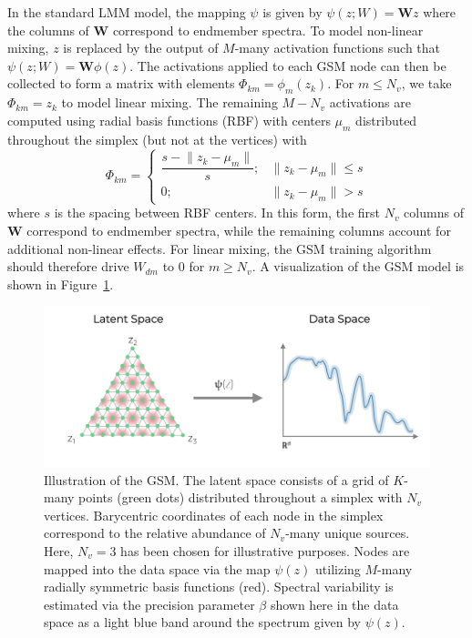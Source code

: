 \documentclass[remotesensing,article,submit,pdftex,moreauthors]{Definitions/mdpi}
\begin{document}
In the standard LMM model, the mapping $\psi$ is given by $\psi(z;W) = \mathbf{W}z$ where the columns of $\mathbf{W}$ correspond to endmember spectra. To model non-linear mixing, $z$ is replaced by the output of $M$-many activation functions such that $\psi(z;W) = \mathbf{W}\phi(z)$. The activations applied to each GSM node can then be collected to form a matrix with elements $\Phi_{km} = \phi_m(z_k)$. For $m \leq N_v$, we take $\Phi_{km} = z_k$ to model linear mixing. The remaining  $M-N_v$ activations are computed using radial basis functions (RBF) with centers $\mu_m$ distributed throughout the simplex (but not at the vertices) with 
\begin{equation}\label{eq:act-function}
    \Phi_{km} = \begin{cases}
        \dfrac{s - \lVert z_k - \mu_m \rVert}{s}; & \lVert z_k - \mu_m \rVert \leq s \\
        0; & \lVert z_k - \mu_m \rVert > s
    \end{cases}
\end{equation}
where $s$ is the spacing between RBF centers. In this form, the first $N_v$ columns of $\mathbf{W}$ correspond to endmember spectra, while the remaining columns account for additional non-linear effects. For linear mixing, the GSM training algorithm should therefore drive $W_{dm}$ to $0$ for $m\geq N_v$. A visualization of the GSM model is shown in Figure~\ref{fig:gsm-diagram}.

\begin{figure}[H]
\includegraphics[width=\columnwidth]{methods/gsm/gsm-diagram.png}
\caption{Illustration of the GSM. The latent space consists of a grid of $K$-many points (green dots) distributed throughout a simplex with $N_v$ vertices. Barycentric coordinates of each node in the simplex correspond to the relative abundance of $N_v$-many unique sources. Here, $N_v=3$ has been chosen for illustrative purposes. Nodes are mapped into the data space via the map $\psi(z)$ utilizing $M$-many radially symmetric basis functions (red). Spectral variability is estimated via the precision parameter $\beta$ shown here in the data space as a light blue band around the spectrum given by $\psi(z)$.}
\label{fig:gsm-diagram}
\end{figure}  
\end{document}
